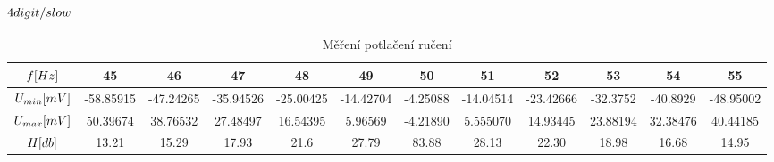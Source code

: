 \documentclass{article}
\begin{document}
\subsubsection{\(4\-digit/slow\)}
\begin{table}[H]
    \footnotesize
    \hspace{-10mm}
    \begin{tabular}{|c|c|c|c|c|c|c|c|c|c|c|c|}
    \hline
    \(f\-[Hz]\)                     & 45        & 46	    & 47	    & 48	    & 49	    & 50	    & 51	    & 52	    & 53	    & 54        & 55        \\ \hline
    \(U_{min}\-[mV]\) 	            & -58.85915 & -47.24265 & -35.94526 & -25.00425 & -14.42704 & -4.25088  & -14.04514 & -23.42666 & -32.3752  & -40.8929  & -48.95002 \\ \hline
    \(U_{max}\-[mV]\)	            & 50.39674	& 38.76532	& 27.48497	& 16.54395	& 5.96569	& -4.21890	& 5.555070  & 14.93445	& 23.88194	& 32.38476  & 40.44185  \\ \hline
    \(H\-[db]\)                     & 13.21     & 15.29		& 17.93	   	& 21.6		& 27.79		& 83.88		& 28.13		& 22.30		& 18.98		& 16.68		& 14.95     \\ \hline
    \end{tabular}
    \caption{\label{potlaceni_ruseni} Měření potlačení ručení}
    \normalsize
\end{table}
\end{document}
